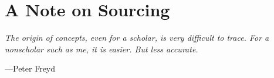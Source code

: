 
\newpage


\part*{A Note on Sourcing}

\begin{displayquote}
	\textit{The origin of concepts, even for a scholar, is very difficult to trace. For a nonscholar such as me, it is easier. But less accurate.}
	\begin{flushright}
		---Peter Freyd
	\end{flushright}
	\vspace{4mm}
\end{displayquote}

